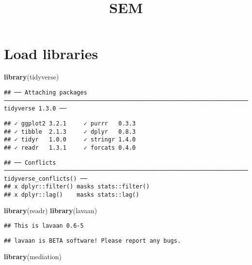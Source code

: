 \documentclass[]{article}
\title{SEM}
\author{}
\date{\vspace{-2.5em}}
\newenvironment{Shaded}{\begin{snugshade}}{\end{snugshade}}
\newcommand{\KeywordTok}[1]{\textcolor[rgb]{0.13,0.29,0.53}{\textbf{#1}}}
\newcommand{\NormalTok}[1]{#1}
\begin{document}
\maketitle

\hypertarget{load-libraries}{%
\section{Load libraries}\label{load-libraries}}

\begin{Shaded}
\begin{Highlighting}[]
\KeywordTok{library}\NormalTok{(tidyverse)}
\end{Highlighting}
\end{Shaded}

\begin{verbatim}
## ── Attaching packages ──────────────────────────────────────────────────────────────────────────────────────────────────────────────── tidyverse 1.3.0 ──
\end{verbatim}

\begin{verbatim}
## ✓ ggplot2 3.2.1     ✓ purrr   0.3.3
## ✓ tibble  2.1.3     ✓ dplyr   0.8.3
## ✓ tidyr   1.0.0     ✓ stringr 1.4.0
## ✓ readr   1.3.1     ✓ forcats 0.4.0
\end{verbatim}

\begin{verbatim}
## ── Conflicts ─────────────────────────────────────────────────────────────────────────────────────────────────────────────────── tidyverse_conflicts() ──
## x dplyr::filter() masks stats::filter()
## x dplyr::lag()    masks stats::lag()
\end{verbatim}

\begin{Shaded}
\begin{Highlighting}[]
\KeywordTok{library}\NormalTok{(readr)}
\KeywordTok{library}\NormalTok{(lavaan)}
\end{Highlighting}
\end{Shaded}

\begin{verbatim}
## This is lavaan 0.6-5
\end{verbatim}

\begin{verbatim}
## lavaan is BETA software! Please report any bugs.
\end{verbatim}

\begin{Shaded}
\begin{Highlighting}[]
\KeywordTok{library}\NormalTok{(mediation)}
\end{Highlighting}
\end{Shaded}
\end{document}

